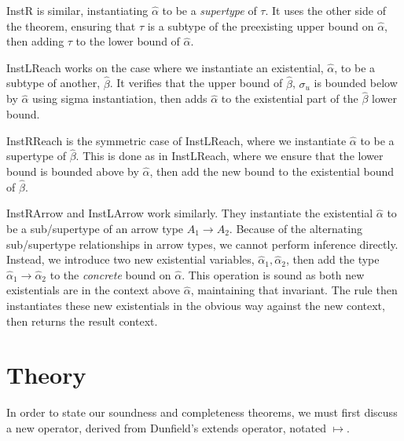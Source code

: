 \documentclass{sig-alternate}
\newcommand{\alphahat}{\hat{\alpha}}
\newcommand{\betahat}{\hat{\beta}}
\newcommand{\topbound}{\sigma_{u}}
\begin{document}
InstR is similar, instantiating $\alphahat$ to be a \emph{supertype} of $\tau$. It uses the other side of the theorem, ensuring that $\tau$ is a subtype of the preexisting upper bound on $\alphahat$, then adding $\tau$ to the lower bound of $\alphahat$.

InstLReach works on the case where we instantiate an existential, $\alphahat$, to be a subtype of another, $\betahat$. It verifies that the upper bound of $\betahat$, $\topbound$ is bounded below by $\alphahat$ using sigma instantiation, then adds $\alphahat$ to the existential part of the $\betahat$ lower bound.

InstRReach is the symmetric case of InstLReach, where we instantiate $\alphahat$ to be a supertype of $\betahat$. This is done as in InstLReach, where we ensure that the lower bound is bounded above by $\alphahat$, then add the new bound to the existential bound of $\betahat$.

InstRArrow and InstLArrow work similarly. They instantiate the existential $\alphahat$ to be a sub/supertype of an arrow type $A_1 \rightarrow A_2$. Because of the alternating sub/supertype relationships in arrow types, we cannot perform inference directly. Instead, we introduce two new existential variables, $\alphahat_1, \alphahat_2$, then add the type $\alphahat_1\rightarrow\alphahat_2$ to the \emph{concrete} bound on $\alphahat$. This operation is sound as both new existentials are in the context above $\alphahat$, maintaining that invariant. The rule then instantiates these new existentials in the obvious way against the new context, then returns the result context. 

\section{Theory}
In order to state our soundness and completeness theorems, we must first discuss a new operator, derived from Dunfield's extends operator, notated $\longmapsto$. 




\end{document}
